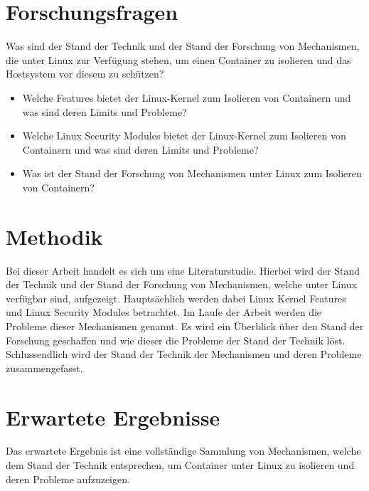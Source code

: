 \section{Forschungsfragen}
Was sind der Stand der Technik und der Stand der Forschung von Mechanismen, die
unter Linux zur Verfügung stehen, um einen Container zu isolieren und das
Hostsystem vor diesem zu schützen?

\begin{itemize}
  \item Welche Features bietet der Linux-Kernel zum Isolieren von Containern
    und was sind deren Limits und Probleme?
  \item Welche Linux Security Modules bietet der Linux-Kernel zum Isolieren von
    Containern und was sind deren Limits und Probleme?
  \item Was ist der Stand der Forschung von Mechanismen unter Linux zum
    Isolieren von Containern?
\end{itemize}

\section{Methodik}
Bei dieser Arbeit handelt es sich um eine Literaturstudie. Hierbei wird der
Stand der Technik und der Stand der Forschung von Mechanismen, welche unter
Linux verfügbar sind, aufgezeigt. Hauptsächlich werden dabei Linux Kernel
Features und Linux Security Modules betrachtet. Im Laufe der Arbeit werden die
Probleme dieser Mechanismen genannt. Es wird ein Überblick über den
Stand der Forschung geschaffen und wie dieser die Probleme der Stand der
Technik löst. Schlussendlich wird der Stand der Technik der Mechanismen
und deren Probleme zusammengefasst.

\section{Erwartete Ergebnisse}
Das erwartete Ergebnis ist eine vollständige Sammlung von Mechanismen, welche
dem Stand der Technik entsprechen, um Container unter Linux zu isolieren und
deren Probleme aufzuzeigen. 
